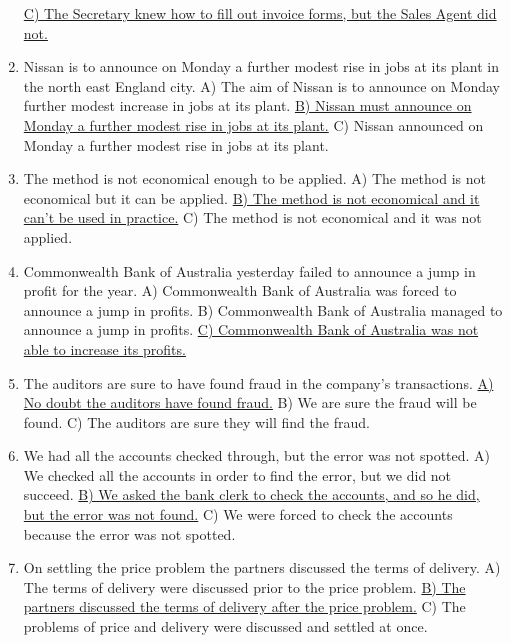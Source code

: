 \documentclass[main.tex]{subfiles}
\begin{document}
\begin{enumerate}[nosep, leftmargin=*]
		\uline{C) The Secretary knew how to fill out invoice forms, but the Sales Agent did not.}
	\item Nissan is to announce on Monday a further modest rise in jobs at its plant in the north east England city.\newline
		A) The aim of Nissan is to announce on Monday further modest increase in jobs at its plant.\newline
		\uline{B) Nissan must announce on Monday a further modest rise in jobs at its plant.}\newline
		C) Nissan announced on Monday a further modest rise in jobs at its plant.
	\item The method is not economical enough to be applied.\newline
		A) The method is not economical but it can be applied.\newline
		\uline{B) The method is not economical and it can't be used in practice.}\newline
		C) The method is not economical and it was not applied.
	\item Commonwealth Bank of Australia yesterday failed to announce a jump in profit for the year.\newline
		A) Commonwealth Bank of Australia was forced to announce a jump in profits.\newline
		B) Commonwealth Bank of Australia managed to announce a jump in profits.\newline
		\uline{C) Commonwealth Bank of Australia was not able to increase its profits.}
	\item The auditors are sure to have found fraud in the company's transactions.\newline
		\uline{A) No doubt the auditors have found fraud.}\newline
		B) We are sure the fraud will be found.\newline
		C) The auditors are sure they will find the fraud.
	\item We had all the accounts checked through, but the error was not spotted.\newline
		A) We checked all the accounts in order to find the error, but we did not succeed.\newline
		\uline{B) We asked the bank clerk to check the accounts, and so he did, but the error was not found.}\newline
		C) We were forced to check the accounts because the error was not spotted.
	\item On settling the price problem the partners discussed the terms of delivery.\newline
		A) The terms of delivery were discussed prior to the price problem.\newline
		\uline{B) The partners discussed the terms of delivery after the price problem.}\newline
		C) The problems of price and delivery were discussed and settled at once.
\end{enumerate}
\ 
\end{document}
